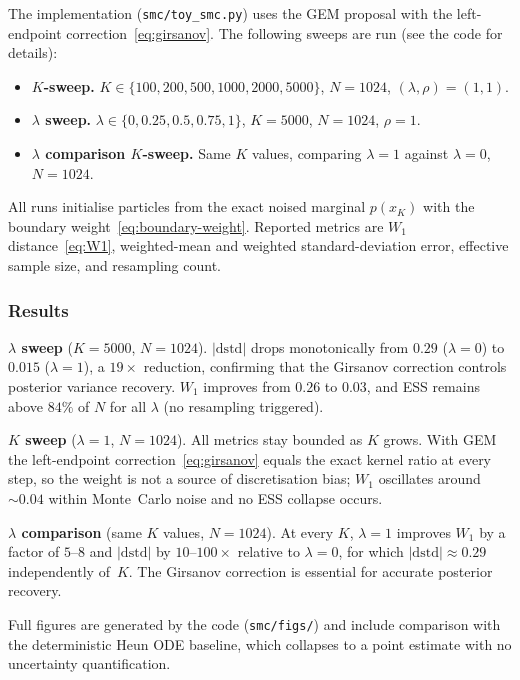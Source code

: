 \documentclass[11pt]{article}
\begin{document}
The implementation (\texttt{smc/toy\_smc.py}) uses the GEM proposal
with the left-endpoint correction~\eqref{eq:girsanov}.
The following sweeps are run (see the code for details):
\begin{itemize}
  \item \textbf{$K$-sweep.}
        $K\in\{100,200,500,1000,2000,5000\}$,
        $N=1024$, $(\lambda,\rho)=(1,1)$.
  \item \textbf{$\lambda$ sweep.}
        $\lambda\in\{0,0.25,0.5,0.75,1\}$,
        $K=5000$, $N=1024$, $\rho=1$.
  \item \textbf{$\lambda$ comparison $K$-sweep.}
        Same $K$ values, comparing $\lambda=1$ against $\lambda=0$,
        $N=1024$.
\end{itemize}
All runs initialise particles from the exact noised marginal
$p(x_K)$ with the boundary weight~\eqref{eq:boundary-weight}.
Reported metrics are $W_1$ distance~\eqref{eq:W1}, weighted-mean and
weighted standard-deviation error, effective sample size, and
resampling count.

\subsubsection*{Results}

\textbf{$\lambda$ sweep} ($K=5000$, $N=1024$).
$|\mathrm{dstd}|$ drops monotonically from $0.29$ ($\lambda=0$)
to $0.015$ ($\lambda=1$), a $19\times$ reduction, confirming that the
Girsanov correction controls posterior variance recovery.
$W_1$ improves from $0.26$ to $0.03$, and ESS remains above $84\%$ of
$N$ for all $\lambda$ (no resampling triggered).

\textbf{$K$ sweep} ($\lambda=1$, $N=1024$).
All metrics stay bounded as $K$ grows.
With GEM the left-endpoint correction~\eqref{eq:girsanov} equals the
exact kernel ratio at every step, so the weight is not a source of
discretisation bias; $W_1$ oscillates around $\sim0.04$ within
Monte~Carlo noise and no ESS collapse occurs.

\textbf{$\lambda$ comparison} (same $K$ values, $N=1024$).
At every $K$, $\lambda=1$ improves $W_1$ by a factor of $5$--$8$
and $|\mathrm{dstd}|$ by $10$--$100\times$ relative to
$\lambda=0$, for which $|\mathrm{dstd}|\approx0.29$ independently
of~$K$.
The Girsanov correction is essential for accurate posterior recovery.

Full figures are generated by the code (\texttt{smc/figs/}) and
include comparison with the deterministic Heun ODE baseline, which
collapses to a point estimate with no uncertainty quantification.
\end{document}
